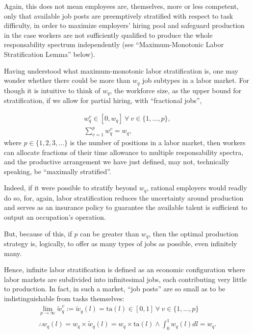 \documentclass[hidelinks, nonatbib]{elsarticle}
\begin{document}
\begin{definition}
    Again, this does not mean employees are, themselves, more or less competent, only that available job posts are preemptively stratified with respect to task difficulty, in order to maximize employers' hiring pool and safeguard production in the case workers are not sufficiently qualified to produce the whole responsability spectrum independently (see ``Maximum-Monotonic Labor Stratification Lemma'' below).    
\end{definition}
\begin{lemma}
    \label{isl}
    Having understood what maximum-monotonic labor stratification is, one may wonder whether there could be more than $w_q$ job subtypes in a labor market. For though it is intuitive to think of $w_q$, the workforce size, as the upper bound for stratification, if we allow for partial hiring, with ``fractional jobs'',

\end{lemma}
\begin{gather}
w_{q}^{v} 
\in 
[0, w_q]
\
\forall
\
v \in \{1, \dots, p\}
,
\\
\sum_{v=1}^{p}
w_{q}^{v}
=
w_q
,
\end{gather}
where $p \in \{1, 2, 3, \dots\}$ is the number of positions in a labor market, then workers can allocate fractions of their time allowance to multiple responsability spectra, and the productive arrangement we have just defined, may not, technically speaking, be ``maximally stratified''. 

Indeed, if it were possible to stratify beyond $w_q$, rational employers would readly do so, for, again, labor stratification reduces the uncertainty around production and serves as an insurance policy to guarantee the available talent is sufficient to output an occupation's operation.

But, because of this, if $p$ can be greater than $w_q$, then the optimal production strategy is, logically, to offer as many types of jobs as possible, even infinitely many.

Hence, infinite labor stratification is defined as an economic configuration where labor markets are subdivided into infinitesimal jobs, each contributing very little to production. In fact, in such a market, ``job posts'' are so small as to be indistinguishable from tasks themselves:
\begin{gather}
\lim_{p \rightarrow \infty}{
    \tilde{w}_{q}^{v}
}
:= 
\tilde{w}_{q}(l)
=
\text{ta}(l)
\in [0,1]
\
\forall
\
v \in \{1, \dots, p\}
\\
\therefore
w_{q}(l)
= 
w_q \times \tilde{w}_{q}(l)
=
w_q \times \text{ta}(l)
\land
\int_{0}^{1}{
    w_{q}(l)
    dl
}
=
w_q
.
\end{gather}
\end{document}
